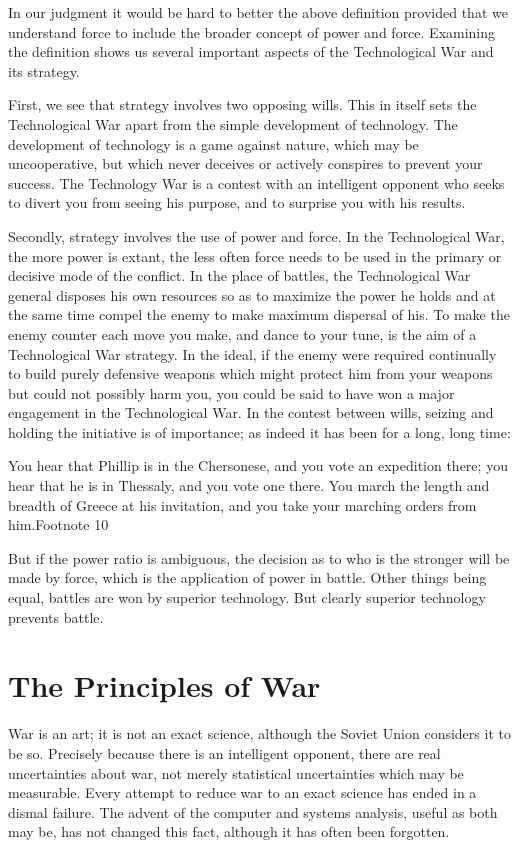 In our judgment it would be hard to better the above definition provided that we understand force to include the broader concept of power and force. Examining the definition shows us several important aspects of the Technological War and its strategy.

First, we see that strategy involves two opposing wills. This in itself sets the Technological War apart from the simple development of technology. The development of technology is a game against nature, which may be uncooperative, but which never deceives or actively conspires to prevent your success. The Technology War is a contest with an intelligent opponent who seeks to divert you from seeing his purpose, and to surprise you with his results.

Secondly, strategy involves the use of power and force. In the Technological War, the more power is extant, the less often force needs to be used in the primary or decisive mode of the conflict. In the place of battles, the Technological War general disposes his own resources so as to maximize the power he holds and at the same time compel the enemy to make maximum dispersal of his. To make the enemy counter each move you make, and dance to your tune, is the aim of a Technological War strategy. In the ideal, if the enemy were required continually to build purely defensive weapons which might protect him from your weapons but could not possibly harm you, you could be said to have won a major engagement in the Technological War. In the contest between wills, seizing and holding the initiative is of importance; as indeed it has been for a long, long time:

You hear that Phillip is in the Chersonese, and you vote an expedition there; you hear that he is in Thessaly, and you vote one there. You march the length and breadth of Greece at his invitation, and you take your marching orders from him.Footnote 10

But if the power ratio is ambiguous, the decision as to who is the stronger will be made by force, which is the application of power in battle. Other things being equal, battles are won by superior technology. But clearly superior technology prevents battle.

\section{The Principles of War}
War is an art; it is not an exact science, although the Soviet Union considers it to be so. Precisely because there is an intelligent opponent, there are real uncertainties about war, not merely statistical uncertainties which may be measurable. Every attempt to reduce war to an exact science has ended in a dismal failure. The advent of the computer and systems analysis, useful as both may be, has not changed this fact, although it has often been forgotten.

